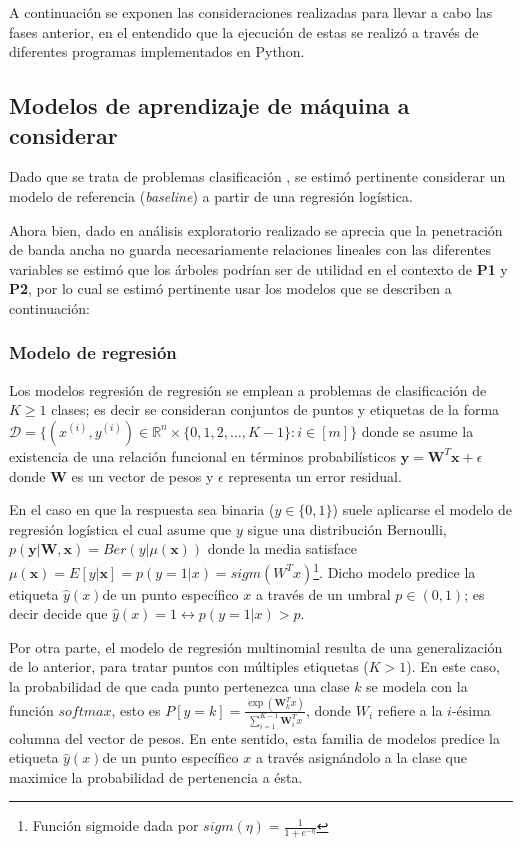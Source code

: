 \documentclass[9pt,twocolumn,twoside]{ilcss}
\begin{document}
A continuación se exponen las consideraciones realizadas para llevar a cabo las fases anterior, en el entendido que la ejecución de estas se realizó a través de diferentes programas implementados en Python.

\subsection{Modelos de aprendizaje de máquina a considerar}

Dado que se trata de problemas clasificación , se estimó pertinente considerar un modelo de referencia (\emph{baseline}) a partir de una regresión logística.

Ahora bien, dado en análisis exploratorio realizado se aprecia que la penetración de banda ancha no guarda necesariamente relaciones lineales con las diferentes variables se estimó que los árboles podrían ser de utilidad en el contexto de \textbf{P1} y \textbf{P2}, por lo cual se estimó pertinente usar los modelos que se describen a continuación:

\subsubsection{Modelo de regresión}

Los modelos regresión de regresión se emplean a problemas de clasificación de $K\geq 1$ clases; es decir se consideran conjuntos de puntos y etiquetas de la forma ${\mathcal D} =\{(x^{(i)}, y^{(i)}) \in \mathbb{R}^n \times \{0,1,2, \ldots, K-1\}: i\in [m] \}$ donde se asume la existencia de una relación funcional en términos probabilísticos $\mathbf{y} = \mathbf{W}^T \mathbf{x} + \epsilon$ donde $\mathbf{W}$ es un vector de pesos y $\epsilon$ representa un error residual.

En el caso en que la respuesta sea binaria ($y\in \{0,1\}$) suele aplicarse el modelo de regresión logística el cual asume que $y$ sigue una distribución Bernoulli, $p(\mathbf{y}| \mathbf{W}, \mathbf{x})= Ber(y|\mu(\mathbf{x}))$ donde la media satisface $\mu(\mathbf{x}) = E[y | \mathbf{x}] = p(y=1|x) =sigm(W^Tx)$\footnote{Función sigmoide dada por $sigm(\eta) = \frac{1}{1+ e^{-\eta}}$}. Dicho modelo predice la etiqueta $\hat{y}(x)$de un punto específico $x$ a través de un umbral $p\in (0,1)$; es decir decide que $\hat{y}(x)=1 \leftrightarrow p(y=1|x)>p$.

Por otra parte, el modelo de regresión multinomial resulta de una generalización de lo anterior, para tratar puntos con múltiples etiquetas ($K>1$). En este caso, la probabilidad de que cada punto pertenezca una clase $k$ se modela con la función $softmax$, esto es $P[y=k] = \frac{\exp(\mathbf{W}_k^T x )}{\sum_{i=1}^{K-1}\mathbf{W}_i^T x}$, donde $W_i$ refiere a la $i$-ésima columna del vector de pesos. En ente sentido, esta familia de modelos predice la etiqueta $\hat{y}(x)$de un punto específico $x$ a través asignándolo a la clase que maximice la probabilidad de pertenencia a ésta.
\end{document}
